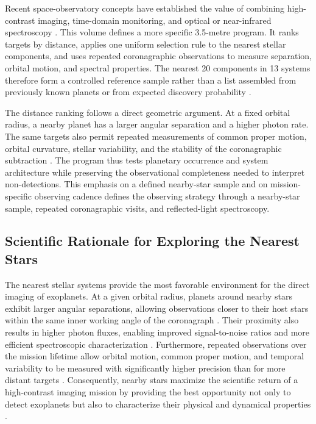 Recent space-observatory concepts have established the value of combining
high-contrast imaging, time-domain monitoring, and optical or near-infrared
spectroscopy \cite{roy2026B,wevers2026B}. This volume defines a more specific
3.5-metre program. It ranks targets by distance, applies one uniform
selection rule to the nearest stellar components, and uses repeated
coronagraphic observations to measure separation, orbital motion, and
spectral properties. The nearest 20 components in 13 systems therefore form
a controlled reference sample rather than a list assembled from previously
known planets or from expected discovery probability \cite{Henry2018,Gaia2022}.

The distance ranking follows a direct geometric argument. At a fixed orbital
radius, a nearby planet has a larger angular separation and a higher photon
rate. The same targets also permit repeated measurements of common proper
motion, orbital curvature, stellar variability, and the stability of the
coronagraphic subtraction \cite{Traub2010,Macintosh2015}. The program thus
tests planetary occurrence and system architecture while preserving the
observational completeness needed to interpret non-detections. This emphasis
on a defined nearby-star sample and on mission-specific observing cadence
defines the observing strategy through a nearby-star sample, repeated
coronagraphic visits, and reflected-light spectroscopy.

\subsection{Scientific Rationale for Exploring the Nearest Stars}
\label{sec:Rationale_Nearest}

The nearest stellar systems provide the most favorable environment for the direct 
imaging of exoplanets. At a given orbital radius, planets around nearby stars exhibit larger angular separations, allowing observations closer to their host stars within the same inner working angle of the coronagraph \cite{Traub2010}. 
Their proximity also results in higher photon fluxes, enabling improved signal-to-noise ratios and more efficient spectroscopic characterization \cite{LUVOIR2019}. 
Furthermore, repeated observations over the mission lifetime allow orbital motion, common proper motion, and temporal variability to be measured with significantly higher precision than for more distant targets \cite{Macintosh2015}. Consequently, nearby stars maximize the scientific return of a
high-contrast imaging mission by providing the best opportunity not only to detect
exoplanets but also to characterize their physical and dynamical properties
\cite{LUVOIR2019}.

